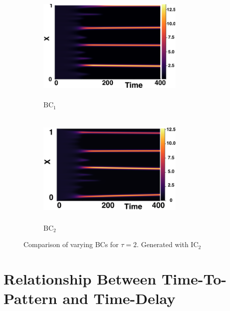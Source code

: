 \begin{figure}[H]
    \centering
    \begin{subfigure}[b]{0.45\textwidth}
        \centering
        \includegraphics[width=7cm,height=5.5cm]{ic22.png}
        \caption{$\text{BC}_1$}
        \label{}
    \end{subfigure}
    \hfill
    \begin{subfigure}[b]{0.45\textwidth}
        \centering
        \includegraphics[width=7cm,height=5.5cm]{bc2.png}
        \caption{$\text{BC}_2$}
        \label{}
    \end{subfigure}
    \caption{Comparison of varying BCs for $\tau=2$. Generated with $\text{IC}_2$}
    \label{fig:bctau3}
\end{figure}

\section{Relationship Between Time-To-Pattern and Time-Delay}\label{section:delaypatt}

